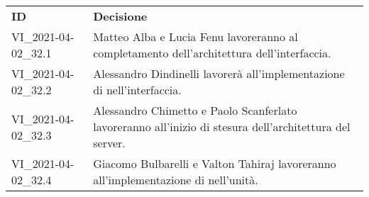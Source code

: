 \documentclass[]{article}
\begin{document}
	\begin{table} [h!]
		\begin{center}
			\begin{tabular} { m{2cm} m{14cm} }
				\rowcolor{lightgray}
				\textbf{ID} & \textbf{Decisione}\\
				VI\_2021-04-02\_32.1 & Matteo Alba e Lucia Fenu lavoreranno al completamento dell'architettura dell'interfaccia.\\
				VI\_2021-04-02\_32.2 & Alessandro Dindinelli lavorerà all'implementazione di \glock{WebSocket} nell'interfaccia.\\
				VI\_2021-04-02\_32.3 & Alessandro Chimetto e Paolo Scanferlato lavoreranno all'inizio di stesura dell'architettura del server.\\
				VI\_2021-04-02\_32.4 & Giacomo Bulbarelli e Valton Tahiraj lavoreranno all'implementazione di \glock{WebSocket} nell'unità.\\
			\end{tabular}
		\end{center}
	\end{table}
\end{document}
